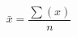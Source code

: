 \documentclass{article}
\begin{document}
\begin{equation}
\bar{x} = \frac{\sum(x)}{n}
\end{equation}
\end{document}
